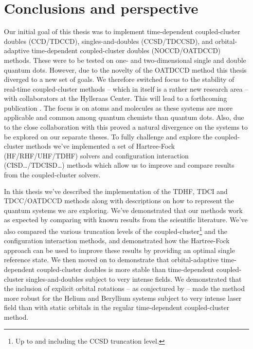 \chapter{Conclusions and perspective}
    Our initial goal of this thesis was to implement time-dependent
    coupled-cluster doubles (CCD/TDCCD), singles-and-doubles (CCSD/TDCCSD), and
    orbital-adaptive time-dependent coupled-cluster doubles (NOCCD/OATDCCD)
    methods.
    These were to be tested on one- and two-dimensional single and double
    quantum dots.
    However, due to the novelty of the OATDCCD method this thesis diverged to a
    new set of goals.
    We therefore switched focus to the stability of real-time coupled-cluster
    methods -- which in itself is a rather new research area -- with
    collaborators at the Hylleraas Center.
    This will lead to a forthcoming publication \cite{oa-stability}.
    The focus is on atoms and molecules as these systems are more applicable and
    common among quantum chemists than quantum dots.
    Also, due to the close collaboration with \citeauthor{greg-winther}
    \cite{greg-winther} this proved a natural divergence on the systems to be
    explored on our separate theses.
    To fully challenge and explore the coupled-cluster methods we've implemented
    a set of Hartree-Fock (HF/RHF/UHF/TDHF) solvers and configuration
    interaction (CISD\dots/TDCISD\dots) methods which allow us to improve and
    compare results from the coupled-cluster solvers.

    In this thesis we've described the implementation of the TDHF, TDCI and
    TDCC/OATDCCD methods along with descriptions on how to represent the quantum
    systems we are exploring.
    We've demonstrated that our methods work as expected by comparing with known
    results from the scientific literature.
    We've also compared the various truncation levels of the
    coupled-cluster\footnote{%
        Up to and including the CCSD truncation level.
    }
    and the configuration interaction methods, and demonstrated how the
    Hartree-Fock approach can be used to improve these results by providing an
    optimal single reference state.
    We then moved on to demonstrate that orbital-adaptive time-dependent
    coupled-cluster doubles is more stable than time-dependent coupled-cluster
    singles-and-doubles subject to very intense fields.
    We demonstrated that the inclusion of explicit orbital rotations -- as
    conjectured by \citeauthor{pedersen2018symplectic}
    \cite{pedersen2018symplectic} -- made the method more robust for the Helium
    and Beryllium systems subject to very intense laser field than with static
    orbitals in the regular time-dependent coupled-cluster method.

